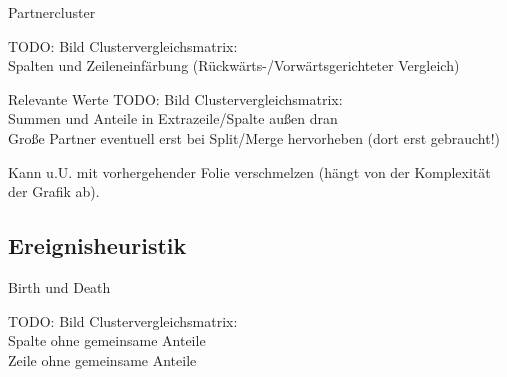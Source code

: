 \documentclass[10pt]{beamer}
\newcommand{\wichtig}[1]{\textit{#1}}
\begin{document}
\begin{frame}{Partnercluster}
	
	TODO: Bild Clustervergleichsmatrix:\\
	Spalten und Zeileneinfärbung (Rückwärts-/Vorwärtsgerichteter Vergleich)
	
\end{frame}

\begin{frame}{Relevante Werte}
	TODO: Bild Clustervergleichsmatrix:\\
	Summen und Anteile in Extrazeile/Spalte außen dran\\
	Große Partner eventuell erst bei Split/Merge hervorheben (dort erst gebraucht!)
	
	Kann u.U. mit vorhergehender Folie verschmelzen (hängt von der Komplexität der Grafik ab).

\end{frame}

\subsection{Ereignisheuristik}

\begin{frame}{Birth und Death}
	
	TODO: Bild Clustervergleichsmatrix:\\
	Spalte ohne gemeinsame Anteile\\
	Zeile ohne gemeinsame Anteile
	
\end{frame}
\end{document}
